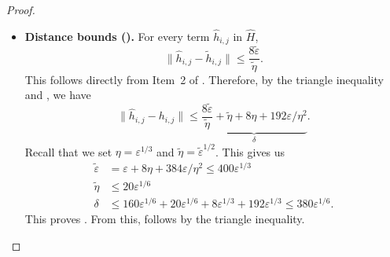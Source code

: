\documentclass[11pt]{article}
\theoremstyle{plain}
\newcommand{\eps}{\varepsilon}
\newcommand{\cQ}{\mathcal{Q}}
\begin{document}
\begin{proof}
\begin{itemize}
\begin{align*}
            [\hat{h}_{i,j}, \hat{h}_{ik}] &= \left[ \sum_{\alpha=0}^3 A_i^\alpha \otimes \cQ_j(\sigma_j^\alpha), \sum_{\beta=0}^3 B_i^\beta \otimes \cQ_k(\sigma_k^\beta) \right] \\
            &= \sum_{\alpha, \beta=0}^{3} \underbrace{[A_i^\alpha, B_i^\beta]}_{=0} \otimes \cQ_j(\sigma_j^\alpha) \otimes \cQ_k(\sigma_k^\beta) \\
            &= 0.
        \end{align*}
        In other words, pinching on the non-overlapping qubits $j,k$ did not ``spoil'' the commutativity of $\tilde{h}_{i,j}$ and $\tilde{h}_{ik}$. Together, this proves .
        \item \textbf{Distance bounds ().} For every term $\hat{h}_{i,j}$ in $\hat{H}$,
        \[ \| \hat{h}_{i,j} - \tilde{h}_{i,j} \| \leq \frac{8\tilde{\eps}}{\tilde{\eta}}. \]
        This follows directly from Item~2 of .
        Therefore, by the triangle inequality and , we have
        \begin{equation}
            \|\hat{h}_{i,j}  - h_{i,j} \| \leq \underbrace{\frac{8\tilde{\eps}}{\tilde{\eta}} + \tilde{\eta} + 8\eta + 192\eps/\eta^2}_{\delta}. 
        \end{equation}
        Recall that we set $\eta = \eps^{1/3}$ and $\tilde{\eta} = \tilde{\eps}^{1/2}$. This gives us 
        \begin{align*}
        \tilde{\eps} &= \eps + 8\eta + 384 \eps/\eta^2 \leq 400 \eps^{1/3} \\
        \tilde{\eta} &\leq 20 \eps^{1/6} \\
        \delta &\leq 160 \eps^{1/6} + 20 \eps^{1/6} + 8\eps^{1/3} + 192 \eps^{1/3} \leq 380 \eps^{1/6}.
        \end{align*}
        This proves . From this,  follows by the triangle inequality.
 \end{itemize}


\end{proof}
\end{document}
